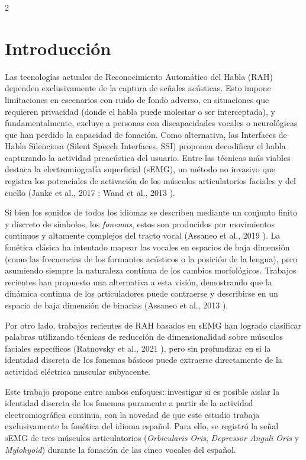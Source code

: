 \documentclass[11pt, letterpaper]{article}
\begin{document}
\begin{multicols*}{2}

\section{Introducción}
Las tecnologías actuales de Reconocimiento Automático del Habla (RAH) dependen exclusivamente de la captura de señales acústicas. Esto impone limitaciones en escenarios con ruido de fondo adverso, en situaciones que requieren privacidad (donde el habla puede molestar o ser interceptada), y fundamentalmente, excluye a personas con discapacidades vocales o neurológicas que han perdido la capacidad de fonación. Como alternativa, las Interfaces de Habla Silenciosa (Silent Speech Interfaces, SSI) proponen decodificar el habla capturando la actividad preacústica del usuario. Entre las técnicas más viables destaca la electromiografía superficial (sEMG), un método no invasivo que registra los potenciales de activación de los músculos articulatorios faciales y del cuello (Janke et al., 2017 \cite{janke2017}; Wand et al., 2013 \cite{wand2013}).

Si bien los sonidos de todos los idiomas se describen mediante un conjunto finito y discreto de símbolos, los \textit{fonemas}, estos son producidos por movimientos continuos y altamente complejos del tracto vocal (Assaneo et al., 2019 \cite{assaneo2019}). La fonética clásica ha intentado mapear las vocales en espacios de baja dimensión (como las frecuencias de los formantes acústicos o la posición de la lengua), pero asumiendo siempre la naturaleza continua de los cambios morfológicos. Trabajos recientes han propuesto una alternativa a esta visión, demostrando que la dinámica continua de los articuladores puede contraerse y describirse en un espacio de baja dimensión de  binarias (Assaneo et al., 2013 \cite{trevisan2013}).

Por otro lado, trabajos recientes de RAH basados en sEMG han logrado clasificar palabras utilizando técnicas de reducción de dimensionalidad sobre músculos faciales específicos (Ratnovsky et al., 2021 \cite{ratnovsky2021}), pero sin profundizar en si la identidad discreta de los fonemas básicos puede extraerse directamente de la actividad eléctrica muscular subyacente.

Este trabajo propone  entre ambos enfoques: investigar si es posible aislar la identidad discreta de los fonemas puramente a partir de la actividad electromiográfica continua, con la novedad de que este estudio trabaja exclusivamente la fonética del idioma español. Para ello, se registró la señal sEMG de tres músculos articulatorios (\textit{Orbicularis Oris}, \textit{Depressor Anguli Oris} y \textit{Mylohyoid}) durante la fonación de las cinco vocales del español.


\end{multicols*}
\end{document}
